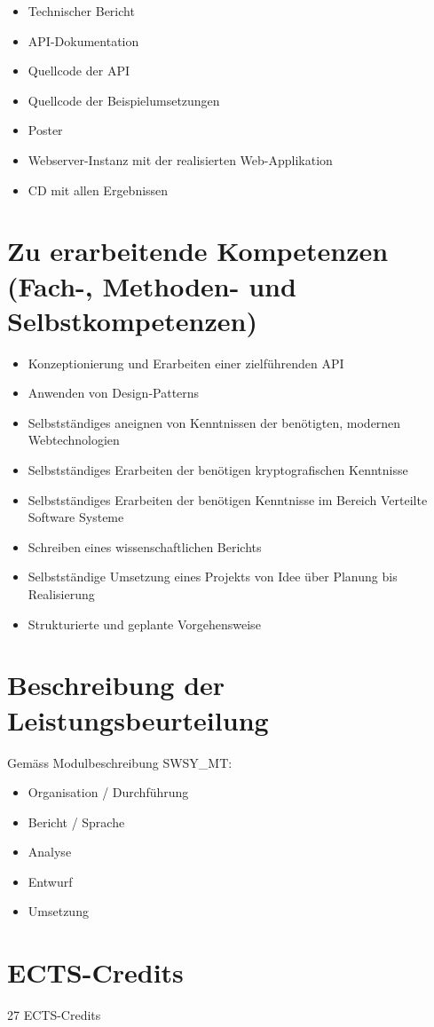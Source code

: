 \begin{itemize}
  \item Technischer Bericht 
  \item API-Dokumentation
  \item Quellcode der API
  \item Quellcode der Beispielumsetzungen
  \item Poster
  \item Webserver-Instanz mit der realisierten Web-Applikation
  \item CD mit allen Ergebnissen
\end{itemize}

\section{Zu erarbeitende Kompetenzen (Fach-, Methoden- und Selbstkompetenzen)}

\begin{itemize}
  \item Konzeptionierung und Erarbeiten einer zielführenden API
  \item Anwenden von Design-Patterns
  \item Selbstständiges aneignen von Kenntnissen der benötigten, modernen
  Webtechnologien
  \item Selbstständiges Erarbeiten der benötigen kryptografischen Kenntnisse
  \item Selbstständiges Erarbeiten der benötigen Kenntnisse im Bereich Verteilte
  Software Systeme
  \item Schreiben eines wissenschaftlichen Berichts
  \item Selbstständige Umsetzung eines Projekts von Idee über Planung bis
  Realisierung
  \item Strukturierte und geplante Vorgehensweise
\end{itemize}

\section{Beschreibung der Leistungsbeurteilung}

Gemäss Modulbeschreibung SWSY_MT:

\begin{itemize}
  \item Organisation / Durchführung
  \item Bericht / Sprache
  \item Analyse
  \item Entwurf
  \item Umsetzung
\end{itemize}

\section{ECTS-Credits}

27 ECTS-Credits

